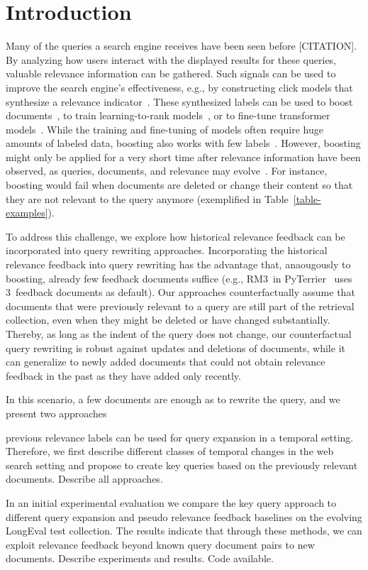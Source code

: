 \section{Introduction}

Many of the queries a search engine receives have been seen before {\color{red}[CITATION]}. By analyzing how users interact with the displayed results for these queries, valuable relevance information can be gathered. Such signals can be used to improve the search engine's effectiveness, e.g., by constructing click models that synthesize a relevance indicator~\cite{chuklin:2015}. These synthesized labels can be used to boost documents~\cite{keller:2024b}, to train learning-to-rank models~\cite{liu:2011}, or to fine-tune transformer models~\cite{lin:2021}. While the training and fine-tuning of models often require huge amounts of labeled data, boosting also works with few labels~\cite{keller:2024b}. However, boosting might only be applied for a very short time after relevance information have been observed, as queries, documents, and relevance may evolve~\cite{keller:2024}. For instance, boosting would fail when documents are deleted or change their content so that they are not relevant to the query anymore (exemplified in Table~\ref{table-examples}).




To address this challenge, we explore how historical relevance feedback can be incorporated into query rewriting approaches. Incorporating the historical relevance feedback into query rewriting has the advantage that, anaougously to boosting, already few feedback documents suffice (e.g., RM3~in PyTerrier~\cite{macdonald:2020} uses 3~feedback documents as default). Our approaches counterfactually assume that documents that were previously relevant to a query are still part of the retrieval collection, even when they might be deleted or have changed substantially. Thereby, as long as the indent of the query does not change, our counterfactual query rewriting is robust against updates and deletions of documents, while it can generalize to newly added documents that could not obtain relevance feedback in the past as they have added only recently.

In this scenario, a few documents are enough as to rewrite the query, and we present two approaches 

previous relevance labels can be used for query expansion in a temporal setting. Therefore, we first describe different classes of temporal changes in the web search setting and propose to create key queries based on the previously relevant documents. {\color{red} Describe all approaches.}

In an initial experimental evaluation we compare the key query approach to different query expansion and pseudo relevance feedback baselines on the evolving LongEval test collection. The results indicate that through these methods, we can exploit relevance feedback beyond known query document pairs to new documents. {\color{red} Describe experiments and results. Code available.}



